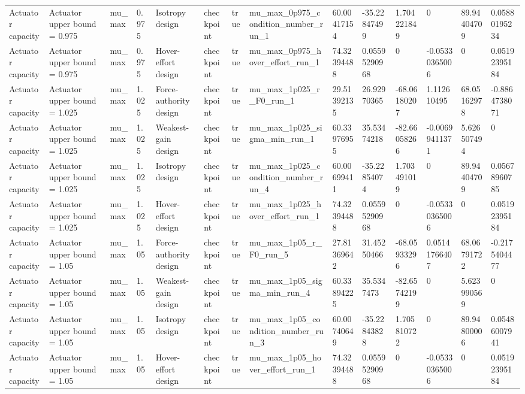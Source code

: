 \begin{tabular}{@{}llllllllllllll@{}}
Actuator capacity & Actuator upper bound = 0.975 & mu\_max & 0.975 & Isotropy design & checkpoint & true & mu\_max\_0p975\_condition\_number\_run\_1 & 60.00417154 & -35.22847499 & 1.704221849 & 0 & 89.94404709 & 0.05880195234 \\
Actuator capacity & Actuator upper bound = 0.975 & mu\_max & 0.975 & Hover-effort design & checkpoint & true & mu\_max\_0p975\_hover\_effort\_run\_1 & 74.32394488 & 0.05595290968 & 0 & -0.05330365006 & 0 & 0.05192395184 \\
Actuator capacity & Actuator upper bound = 1.025 & mu\_max & 1.025 & Force-authority design & checkpoint & true & mu\_max\_1p025\_r\_F0\_run\_1 & 29.51392135 & 26.92970365 & -68.06180207 & 1.112610495 & 68.05162978 & -0.8864738071 \\
Actuator capacity & Actuator upper bound = 1.025 & mu\_max & 1.025 & Weakest-gain design & checkpoint & true & mu\_max\_1p025\_sigma\_min\_run\_1 & 60.33976955 & 35.53474218 & -82.66058266 & -0.00699411371 & 5.626507494 & 0 \\
Actuator capacity & Actuator upper bound = 1.025 & mu\_max & 1.025 & Isotropy design & checkpoint & true & mu\_max\_1p025\_condition\_number\_run\_4 & 60.00699411 & -35.22854074 & 1.703491019 & 0 & 89.94404709 & 0.05678960785 \\
Actuator capacity & Actuator upper bound = 1.025 & mu\_max & 1.025 & Hover-effort design & checkpoint & true & mu\_max\_1p025\_hover\_effort\_run\_1 & 74.32394488 & 0.05595290968 & 0 & -0.05330365006 & 0 & 0.05192395184 \\
Actuator capacity & Actuator upper bound = 1.05 & mu\_max & 1.05 & Force-authority design & checkpoint & true & mu\_max\_1p05\_r\_F0\_run\_5 & 27.81369642 & 31.45250466 & -68.05933296 & 0.05141766407 & 68.06791722 & -0.2175404477 \\
Actuator capacity & Actuator upper bound = 1.05 & mu\_max & 1.05 & Weakest-gain design & checkpoint & true & mu\_max\_1p05\_sigma\_min\_run\_4 & 60.33894225 & 35.5347473 & -82.65742199 & 0 & 5.623990569 & 0 \\
Actuator capacity & Actuator upper bound = 1.05 & mu\_max & 1.05 & Isotropy design & checkpoint & true & mu\_max\_1p05\_condition\_number\_run\_3 & 60.00740649 & -35.22843828 & 1.705810722 & 0 & 89.94800006 & 0.05486007941 \\
Actuator capacity & Actuator upper bound = 1.05 & mu\_max & 1.05 & Hover-effort design & checkpoint & true & mu\_max\_1p05\_hover\_effort\_run\_1 & 74.32394488 & 0.05595290968 & 0 & -0.05330365006 & 0 & 0.05192395184 \\

\end{tabular}

